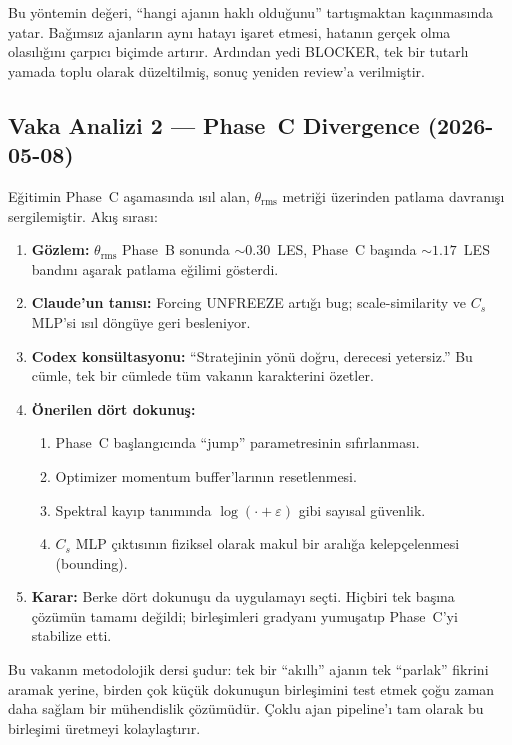 \noindent
Bu yöntemin değeri, ``hangi ajanın haklı olduğunu'' tartışmaktan
kaçınmasında yatar. Bağımsız ajanların aynı hatayı işaret etmesi,
hatanın gerçek olma olasılığını çarpıcı biçimde artırır. Ardından
yedi BLOCKER, tek bir tutarlı yamada toplu olarak düzeltilmiş, sonuç
yeniden review'a verilmiştir.

\subsection{Vaka Analizi 2 — Phase~C Divergence (2026-05-08)}

Eğitimin Phase~C aşamasında ısıl alan, $\theta_{\mathrm{rms}}$
metriği üzerinden patlama davranışı sergilemiştir. Akış sırası:

\begin{enumerate}
  \item \textbf{Gözlem:} $\theta_{\mathrm{rms}}$ Phase~B sonunda
        $\sim 0.30$~LES, Phase~C başında $\sim 1.17$~LES bandını
        aşarak patlama eğilimi gösterdi.
  \item \textbf{Claude'un tanısı:} Forcing UNFREEZE artığı bug;
        scale-similarity ve $C_s$ MLP'si ısıl döngüye geri besleniyor.
  \item \textbf{Codex konsültasyonu:} ``Stratejinin yönü doğru,
        derecesi yetersiz.'' Bu cümle, tek bir cümlede tüm vakanın
        karakterini özetler.
  \item \textbf{Önerilen dört dokunuş:}
        \begin{enumerate}
          \item Phase~C başlangıcında ``jump'' parametresinin sıfırlanması.
          \item Optimizer momentum buffer'larının resetlenmesi.
          \item Spektral kayıp tanımında $\log(\cdot + \varepsilon)$
                gibi sayısal güvenlik.
          \item $C_s$ MLP çıktısının fiziksel olarak makul bir aralığa
                kelepçelenmesi (bounding).
        \end{enumerate}
  \item \textbf{Karar:} Berke dört dokunuşu da uygulamayı seçti.
        Hiçbiri tek başına çözümün tamamı değildi; birleşimleri
        gradyanı yumuşatıp Phase~C'yi stabilize etti.
\end{enumerate}

Bu vakanın metodolojik dersi şudur: tek bir ``akıllı'' ajanın tek
``parlak'' fikrini aramak yerine, birden çok küçük dokunuşun
birleşimini test etmek çoğu zaman daha sağlam bir mühendislik
çözümüdür. Çoklu ajan pipeline'ı tam olarak bu birleşimi üretmeyi
kolaylaştırır.

